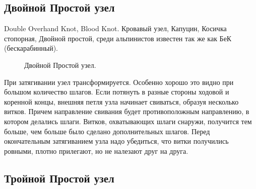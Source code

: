 \subsection{Двойной Простой узел}

Double Overhand Knot, Blood Knot. Кровавый узел, Капуцин, Косичка стопорная, Двойной простой, среди альпинистов известен так же как БеК (бескарабинный).

\begin{figure}[H]\centering
\hfil
\end{figure}
\begin{figure}[H]\centering
\hfil
	\caption{Двойной Простой узел.}\label{ris:Double_Knot}
\end{figure}

При затягивании узел трансформируется. Особенно хорошо это видно при большом количество шлагов. Если потянуть в разные стороны ходовой и коренной концы, внешняя петля узла начинает свиваться, образуя несколько витков. Причем направление свивания будет противоположным направлению, в котором делались шлаги. Витков, охватывающих шлаги снаружи, получится тем больше, чем больше было сделано дополнительных шлагов. Перед окончательным затягиванием узла надо убедиться, что витки получились ровными, плотно прилегают, но не налезают друг на друга.

\subsection{Тройной Простой узел}

\begin{figure}[H]\centering
	\subfloat[Тройной]{\label{ris:Triple_Knot_1}
	\tcbox[enhanced jigsaw,colframe=black,opacityframe=0.5,opacityback=0.5,height=3cm]
		{\centering
			}
		}
\hfil
	\subfloat[Четверной]{\label{ris:Triple_Knot_2}
	\tcbox[enhanced jigsaw,colframe=black,opacityframe=0.5,opacityback=0.5,height=3cm]
		{\centering
			}
		}
\end{figure}

